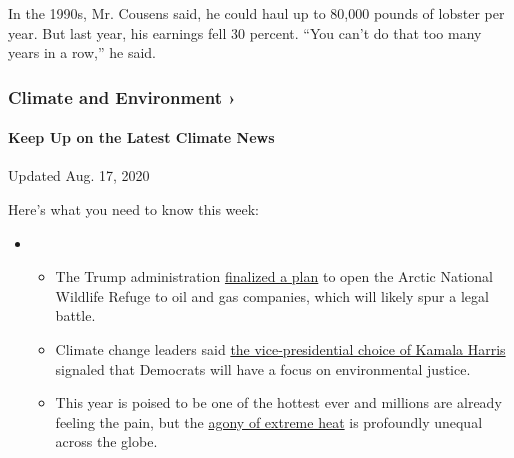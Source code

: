 In the 1990s, Mr. Cousens said, he could haul up to 80,000 pounds of
lobster per year. But last year, his earnings fell 30 percent. ``You
can't do that too many years in a row,'' he said.

\href{https://www.nytimes3xbfgragh.onion/section/climate?action=click\&pgtype=Article\&state=default\&region=MAIN_CONTENT_1\&context=storylines_keepup}{}

\hypertarget{climate-and-environment-}{%
\subsubsection{Climate and Environment
›}\label{climate-and-environment-}}

\hypertarget{keep-up-on-the-latest-climate-news}{%
\paragraph{Keep Up on the Latest Climate
News}\label{keep-up-on-the-latest-climate-news}}

Updated Aug. 17, 2020

Here's what you need to know this week:

\begin{itemize}
\item
  \begin{itemize}
  \tightlist
  \item
    The Trump administration
    \href{https://www.nytimes3xbfgragh.onion/2020/08/17/climate/alaska-oil-drilling-anwr.html?action=click\&pgtype=Article\&state=default\&region=MAIN_CONTENT_1\&context=storylines_keepup}{finalized
    a plan} to open the Arctic National Wildlife Refuge to oil and gas
    companies, which will likely spur a legal battle.
  \item
    Climate change leaders said
    \href{https://www.nytimes3xbfgragh.onion/2020/08/12/climate/kamala-harris-environmental-justice.html?action=click\&pgtype=Article\&state=default\&region=MAIN_CONTENT_1\&context=storylines_keepup}{the
    vice-presidential choice of Kamala Harris} signaled that Democrats
    will have a focus on environmental justice.
  \item
    This year is poised to be one of the hottest ever and millions are
    already feeling the pain, but the
    \href{https://www.nytimes3xbfgragh.onion/interactive/2020/08/06/climate/climate-change-inequality-heat.html?action=click\&pgtype=Article\&state=default\&region=MAIN_CONTENT_1\&context=storylines_keepup}{agony
    of extreme heat} is profoundly unequal across the globe.
  \end{itemize}
\end{itemize}

